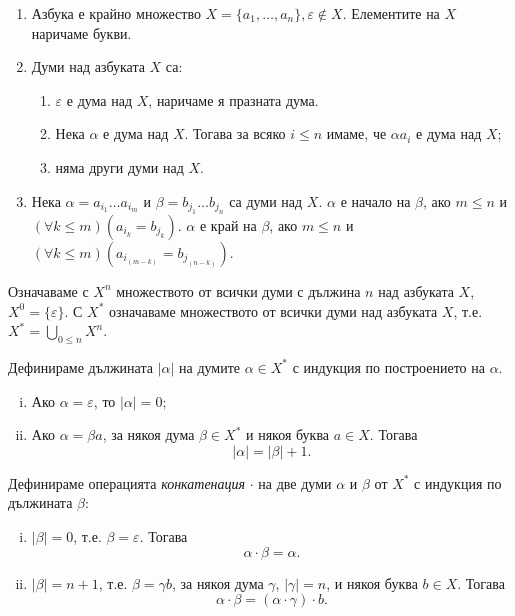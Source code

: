 \begin{dfn}
  \begin{enumerate}
  \item
    Азбука е крайно множество $X = \{a_1,\dots,a_n\}, \varepsilon\not\in X$.
    Елементите на $X$ наричаме букви.
  \item
    Думи над азбуката $X$ са:
    \begin{enumerate}
    \item
      $\varepsilon$ е дума над $X$, наричаме я празната дума.
    \item
      Нека $\alpha$ е дума над $X$. 
      Тогава за всяко $i\leq n$ имаме, че $\alpha a_i$ е дума над $X$;
    \item
      няма други думи над $X$.
    \end{enumerate}
  \item
    Нека $\alpha=a_{i_1}\dots a_{i_m}$ и $\beta=b_{j_1}\dots b_{j_n}$ са думи над $X$.
    $\alpha$ е начало на $\beta$, ако $m\leq n$ и $(\forall k\leq m)(a_{i_k} = b_{j_k})$.
    $\alpha$ е край на $\beta$, ако $m\leq n$ и $(\forall k\leq m)(a_{i_{(m-k)}} = b_{j_{(n-k)}})$.
  \end{enumerate}
  Означаваме с $X^n$ множеството от всички думи с дължина $n$ над азбуката $X$, $X^0 = \{\varepsilon\}$.
  С $X^{*}$ означаваме множеството от всички думи над азбуката $X$, т.е. $X^{*} = \bigcup_{0\leq n} X^{n}$.
\end{dfn}

Дефинираме дължината $|\alpha|$ на думите $\alpha \in X^*$ с индукция по построението на $\alpha$.
\begin{enumerate}[(i)]
  \item
    Ако $\alpha = \varepsilon$, то $|\alpha| = 0$;
  \item
    Ако $\alpha = \beta a$, за някоя дума $\beta\in X^*$ и някоя буква $a\in X$. Тогава \[|\alpha| = |\beta| + 1.\]
\end{enumerate}

Дефинираме операцията {\em конкатенация} $\cdot$ на две думи $\alpha$ и $\beta$ от $X^*$ с индукция по дължината $\beta$:
\begin{enumerate}[(i)]
  \item
    $|\beta| = 0$, т.е. $\beta = \varepsilon$.
    Тогава \[\alpha\cdot\beta = \alpha.\]
  \item
    $|\beta| = n+1$, т.е. $\beta = \gamma b$, за някоя дума $\gamma$, $|\gamma| = n$, и някоя буква $b\in X$.
    Тогава \[\alpha\cdot\beta = (\alpha\cdot\gamma)\cdot b.\]
\end{enumerate}

